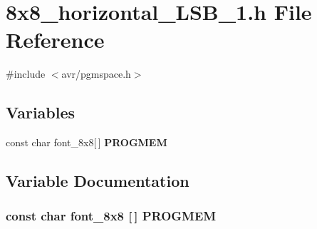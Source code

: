 \section{8x8\_\-horizontal\_\-LSB\_\-1.h File Reference}
\label{8x8__horizontal__LSB__1_8h}
{\ttfamily \#include $<$avr/pgmspace.h$>$}\par
\subsection*{Variables}
\begin{DoxyCompactItemize}
\item 
const char font\_\-8x8[$\,$] {\bf PROGMEM}
\end{DoxyCompactItemize}


\subsection{Variable Documentation}
\subsubsection[{PROGMEM}]{\setlength{\rightskip}{0pt plus 5cm}const char font\_\-8x8 [$\,$] {\bf PROGMEM}}\label{8x8__horizontal__LSB__1_8h_aea5b8cca94e34368e475868cc6493943}

